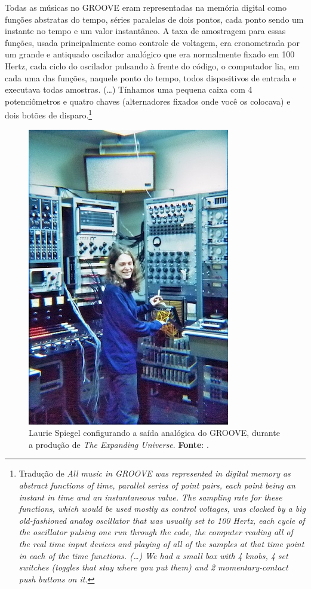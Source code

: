 \begin{citacao}
Todas as músicas no GROOVE eram representadas na memória digital como funções abstratas do tempo, séries paralelas de dois pontos, cada ponto sendo um instante no tempo e um valor instantâneo. A taxa de amostragem para essas funções, usada principalmente como controle de voltagem, era cronometrada por um grande e antiquado oscilador analógico que era normalmente fixado em 100 Hertz, cada ciclo do oscilador pulsando à frente do código, o computador lia, em cada uma das funções, naquele ponto do tempo, todos dispositivos de entrada e executava todas amostras. (\ldots) Tínhamos uma pequena caixa com 4 potenciômetros e quatro chaves (alternadores fixados onde você os colocava) e dois botões de disparo.\footnote{Tradução de \emph{All music in GROOVE was represented in digital memory as abstract functions of time, parallel series of point pairs, each point being an instant in time and an instantaneous value. The sampling rate for these functions, which would be used mostly as control voltages, was clocked by a big old-fashioned analog oscillator that was usually set to 100 Hertz, each cycle of the oscillator pulsing one run through the code, the computer reading all of the real time input devices and playing of all of the samples at that time point in each of the time functions. (\ldots)  We had a small box with 4 knobs, 4 set switches (toggles that stay where you put them) and 2 momentary-contact push buttons on it.}}
\end{citacao}

\begin{figure}[!h]
  \begin{center}
  \includegraphics[scale=0.5]{./imagens/spiegel.jpg}
  \caption{\small Laurie Spiegel configurando a saída analógica do GROOVE, durante a produção de \emph{The Expanding Universe}. \textbf{Fonte}: \cite{spiegel_expanding_1975}.}
  \label{fig:groove}
  \end{center}
\end{figure}

